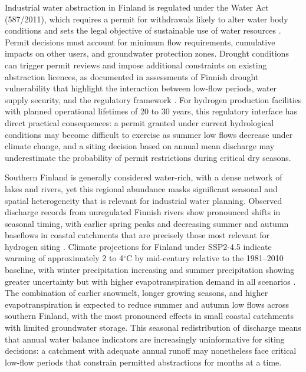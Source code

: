 \documentclass[draft]{agujournal2019}
\begin{document}
Industrial water abstraction in Finland is regulated under the Water Act (587/2011), which requires a permit for withdrawals likely to alter water body conditions and sets the legal objective of sustainable use of water resources \cite{FinnishWaterAct2011}. Permit decisions must account for minimum flow requirements, cumulative impacts on other users, and groundwater protection zones. Drought conditions can trigger permit reviews and impose additional constraints on existing abstraction licences, as documented in assessments of Finnish drought vulnerability that highlight the interaction between low-flow periods, water supply security, and the regulatory framework \cite{veijalainen2019severe}. For hydrogen production facilities with planned operational lifetimes of 20 to 30 years, this regulatory interface has direct practical consequences: a permit granted under current hydrological conditions may become difficult to exercise as summer low flows decrease under climate change, and a siting decision based on annual mean discharge may underestimate the probability of permit restrictions during critical dry seasons.


Southern Finland is generally considered water-rich, with a dense network of lakes and rivers, yet this regional abundance masks significant seasonal and spatial heterogeneity that is relevant for industrial water planning. Observed discharge records from unregulated Finnish rivers show pronounced shifts in seasonal timing, with earlier spring peaks and decreasing summer and autumn baseflows in coastal catchments that are precisely those most relevant for hydrogen siting \cite{lintunen2024changes}. Climate projections for Finland under SSP2-4.5 indicate warming of approximately 2 to 4$^\circ$C by mid-century relative to the 1981--2010 baseline, with winter precipitation increasing and summer precipitation showing greater uncertainty but with higher evapotranspiration demand in all scenarios \cite{ruosteenoja2021projected}. The combination of earlier snowmelt, longer growing seasons, and higher evapotranspiration is expected to reduce summer and autumn low flows across southern Finland, with the most pronounced effects in small coastal catchments with limited groundwater storage. This seasonal redistribution of discharge means that annual water balance indicators are increasingly uninformative for siting decisions: a catchment with adequate annual runoff may nonetheless face critical low-flow periods that constrain permitted abstractions for months at a time.
\end{document}
